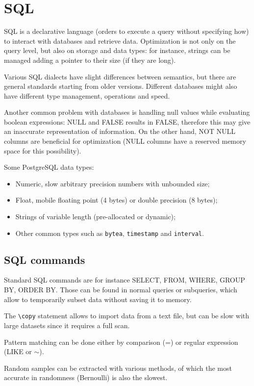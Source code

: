 \section{SQL}
SQL is a declarative language (orders to execute a query without specifying how) to interact with databases and retrieve data. Optimization is not only on the query level, but also on storage and data types: for instance, strings can be managed adding a pointer to their size (if they are long). 

Various SQL dialects have slight differences between semantics, but there are general standards starting from older versions. Different databases might also have different type management, operations and speed.

Another common problem with databases is handling null values while evaluating boolean expressions: NULL and FALSE results in FALSE, therefore this may give an inaccurate representation of information. On the other hand, NOT NULL columns are beneficial for optimization (NULL columns have a reserved memory space for this possibility).

Some PostgreSQL data types:
\begin{itemize}
	\item Numeric, slow arbitrary precision numbers with unbounded size;
	\item Float, mobile floating point (4 bytes) or double precision (8 bytes);
	\item Strings of variable length (pre-allocated or dynamic);
	\item Other common types such as \texttt{bytea}, \texttt{timestamp} and \texttt{interval}.
\end{itemize} 

\subsection{SQL commands}
Standard SQL commands are for instance SELECT, FROM, WHERE, GROUP BY, ORDER BY. Those can be found in normal queries or subqueries, which allow to temporarily subset data without saving it to memory.

The \texttt{\textbackslash copy} statement allows to import data from a text file, but can be slow with large datasets since it requires a full scan.

Pattern matching can be done either by comparison (=) or regular expression (LIKE or $\sim$).

Random samples can be extracted with various methods, of which the most accurate in randomness (Bernoulli) is also the slowest.

